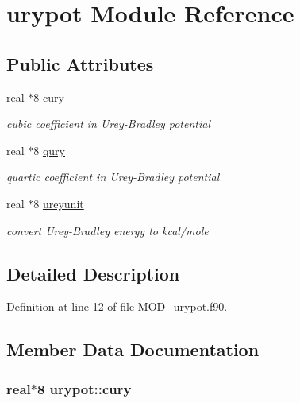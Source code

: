 \hypertarget{classurypot}{\section{urypot Module Reference}
\label{classurypot}
}
\subsection*{Public Attributes}
\begin{DoxyCompactItemize}
\item 
real $\ast$8 \hyperlink{classurypot_a9fdc1713e5c599fd3aa09fbe4d695b96}{cury}
\begin{DoxyCompactList}\small\item\em cubic coefficient in Urey-\/\-Bradley potential \end{DoxyCompactList}\item 
real $\ast$8 \hyperlink{classurypot_aae2e6dc6777babb5c57ef1354587f756}{qury}
\begin{DoxyCompactList}\small\item\em quartic coefficient in Urey-\/\-Bradley potential \end{DoxyCompactList}\item 
real $\ast$8 \hyperlink{classurypot_ae630f4799e1a59f45c7924ba7a44d05e}{ureyunit}
\begin{DoxyCompactList}\small\item\em convert Urey-\/\-Bradley energy to kcal/mole \end{DoxyCompactList}\end{DoxyCompactItemize}


\subsection{Detailed Description}


Definition at line 12 of file M\-O\-D\-\_\-urypot.\-f90.



\subsection{Member Data Documentation}
\hypertarget{classurypot_a9fdc1713e5c599fd3aa09fbe4d695b96}{
\subsubsection[{cury}]{\setlength{\rightskip}{0pt plus 5cm}real$\ast$8 urypot\-::cury}}\label{classurypot_a9fdc1713e5c599fd3aa09fbe4d695b96}


